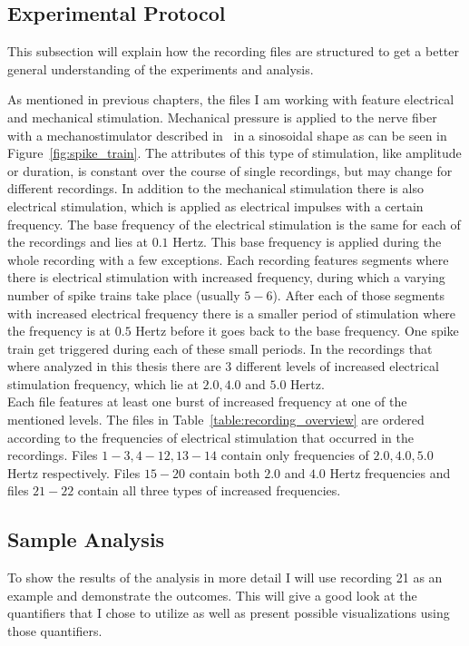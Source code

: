 \subsection{Experimental Protocol}
This subsection will explain how the recording files are structured to get a better general understanding of the experiments and analysis.

As mentioned in previous chapters, the files I am working with feature electrical and mechanical stimulation. Mechanical pressure is applied to the nerve fiber with a mechanostimulator described in~\cite{roberto} in a sinosoidal shape as can be seen in Figure~\ref{fig:spike_train}. The attributes of this type of stimulation, like amplitude or duration, is constant over the course of single recordings, but may change  for different recordings. In addition to the mechanical stimulation there is also electrical stimulation, which is applied as electrical impulses with a certain frequency. The base frequency of the electrical stimulation is the same for each of the recordings and lies at $0.1$ Hertz. This base frequency is applied during the whole recording with a few exceptions. Each recording features segments where there is electrical stimulation with increased frequency, during which a varying number of spike trains take place (usually $5-6$). After each of those segments with increased electrical frequency there is a smaller period of stimulation where the frequency is at $0.5$ Hertz before it goes back to the base frequency. One spike train get triggered during each of these small periods. In the recordings that where analyzed in this thesis there are 3 different levels of increased electrical stimulation frequency, which lie at $2.0, 4.0$ and $5.0$ Hertz.\\
Each file features at least one burst of increased frequency at one of the mentioned levels. The files in Table~\ref{table:recording_overview} are ordered according to the frequencies of electrical stimulation that occurred in the recordings. Files $1-3, 4-12, 13-14$ contain only frequencies of $2.0, 4.0, 5.0$ Hertz respectively. Files $15-20$ contain both $2.0$ and $4.0$ Hertz frequencies and files $21-22$ contain all three types of increased frequencies.\\

\subsection{Sample Analysis}
To show the results of the analysis in more detail I will use recording 21 as an example and demonstrate the outcomes. This will give a good look at the quantifiers that I chose to utilize as well as present possible visualizations using those quantifiers.

